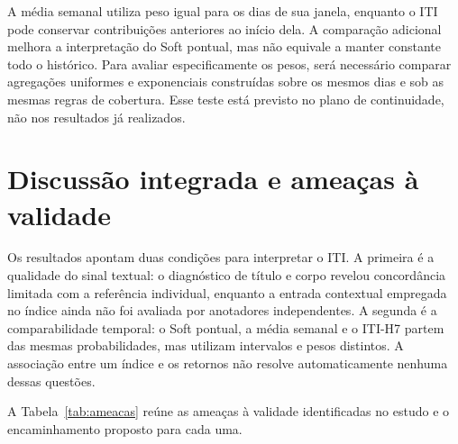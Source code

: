 A média semanal utiliza peso igual para os dias de sua janela, enquanto o ITI pode conservar contribuições anteriores ao início dela. A comparação adicional melhora a interpretação do Soft pontual, mas não equivale a manter constante todo o histórico. Para avaliar especificamente os pesos, será necessário comparar agregações uniformes e exponenciais construídas sobre os mesmos dias e sob as mesmas regras de cobertura. Esse teste está previsto no plano de continuidade, não nos resultados já realizados.

\section{Discussão integrada e ameaças à validade}

Os resultados apontam duas condições para interpretar o ITI. A primeira é a qualidade do sinal textual: o diagnóstico de título e corpo revelou concordância limitada com a referência individual, enquanto a entrada contextual empregada no índice ainda não foi avaliada por anotadores independentes. A segunda é a comparabilidade temporal: o Soft pontual, a média semanal e o ITI-H7 partem das mesmas probabilidades, mas utilizam intervalos e pesos distintos. A associação entre um índice e os retornos não resolve automaticamente nenhuma dessas questões.

A Tabela~\ref{tab:ameacas} reúne as ameaças à validade identificadas no estudo e o encaminhamento proposto para cada uma.


